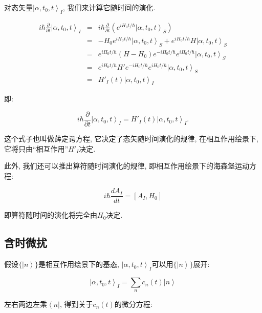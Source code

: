 对态矢量$\left| \alpha,t_0,t  \right\rangle_I $,
我们来计算它随时间的演化.

\begin{eqnarray*}
i\hbar \frac{\partial}{\partial t} \left| \alpha,t_0,t  \right\rangle_I &=& i\hbar \frac{\partial}{\partial t} \left( e^{iH_0t/\hbar} \left| \alpha,t_0,t  \right\rangle_S \right)  \\
  {} &=& -H_0e^{iH_0t/\hbar}\left|\alpha, t_0,t \right\rangle_S + e^{iH_0t/\hbar} H \left|\alpha, t_0,t
  \right\rangle_S\\
  {} &=& e^{iH_0t/\hbar}(H-H_0)e^{-iH_0t/\hbar}e^{iH_0t/\hbar}\left|\alpha, t_0,t
  \right\rangle_S\\
  {} &=& e^{iH_0t/\hbar}H'e^{-iH_0t/\hbar}e^{iH_0t/\hbar}\left|\alpha, t_0,t
  \right\rangle_S\\
  {} &=& H'_I(t)\left|\alpha, t_0,t
  \right\rangle_I
\end{eqnarray*}

即:

\begin{equation*}
i\hbar \frac{\partial}{\partial t} \left| \alpha,t_0,t
\right\rangle_I = H'_I(t)\left|\alpha, t_0,t \right\rangle_I.
\end{equation*}

这个式子也叫做薛定谔方程, 它决定了态矢随时间演化的规律,
在相互作用绘景下, 它将只由``相互作用''$H'_I$决定.

此外, 我们还可以推出算符随时间演化的规律,
即相互作用绘景下的海森堡运动方程:


\begin{equation*}
    i\hbar \frac{dA_I}{dt} = [A_I, H_0]
\end{equation*}

即算符随时间的演化将完全由$H_0$决定.

\subsection{含时微扰}


假设$\{ \left|n \right\rangle \}$是相互作用绘景下的基态, $\left|
\alpha, t_0,t \right\rangle_I$可以用$\{ \left|n \right\rangle
\}$展开:


\begin{equation*}
\left| \alpha, t_0,t \right\rangle_I = \sum_n c_n (t) \left|n
\right\rangle
\end{equation*}

左右两边左乘$\left\langle n \right|$, 得到关于$c_n(t)$的微分方程:


